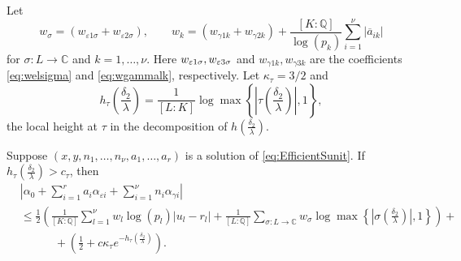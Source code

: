 Let
\begin{equation} \label{eq:wsigma}
w_{\sigma} = (w_{\varepsilon 1 \sigma} + w_{\varepsilon 2 \sigma}), \quad \quad w_k = (w_{\gamma 1 k} + w_{\gamma 2 k}) + \frac{[K:\mathbb{Q}]}{\log(p_k)}\sum_{i=1}^{\nu}|\overline{a}_{ik}|
\end{equation}
for $\sigma: L \to \mathbb{C}$ and $k = 1, \dots, \nu$. Here $w_{\varepsilon 1 \sigma}, w_{\varepsilon 3 \sigma}$ and $w_{\gamma 1 k}, w_{\gamma 3 k}$ are the coefficients \eqref{eq:welsigma} and \eqref{eq:wgammalk}, respectively. Let $\kappa_{\tau} = 3/2$ and 
\[h_{\tau}\left(\frac{\delta_2}{\lambda}\right) = \frac{1}{[L:K]}\log \max \left\{ \left|\tau\left(\frac{\delta_2}{\lambda}\right)\right|, 1\right\},\]
the local height at $\tau$ in the decomposition of $h\left(\frac{\delta_2}{\lambda}\right)$.

\begin{lemma}\label{lem:archellest}
Suppose $(x,y, n_1, \dots, n_{\nu}, a_1, \dots, a_r)$ is a solution of \eqref{eq:EfficientSunit}. If ${h_{\tau} \left(\frac{\delta_2}{\lambda}\right) > c_{\tau}}$, then  
\begin{align*}
&\left|\alpha_0+\sum_{i = 1}^r a_i \alpha_{\varepsilon i} + \sum_{i = 1}^{\nu} n_i \alpha_{\gamma i}\right|\\
	& \leq \frac{1}{2}\left(\frac{1}{[K:\mathbb{Q}]}\sum_{l = 1}^{\nu}w_l \log(p_l)|u_l - r_l| + \frac{1}{[L:\mathbb{Q}]}\sum_{\sigma :L \to \mathbb{C}} w_{\sigma}\log \max \left\{ \left|\sigma\left(\frac{\delta_2}{\lambda}\right)\right|, 1\right\} \right) + \\
	& \quad \quad \quad + \left(\frac{1}{2} + c\kappa_{\tau}e^{-h_{\tau}\left(\frac{\delta_2}{\lambda}\right)}\right).
\end{align*} 
\end{lemma}

